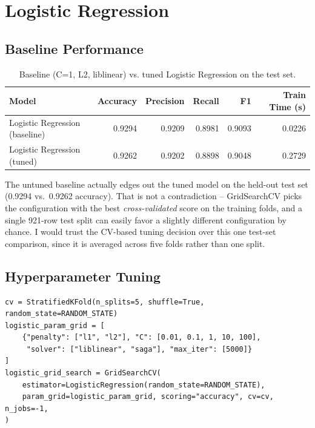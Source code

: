 \documentclass[11pt,a4paper]{article}
\begin{document}
\section{Logistic Regression}

\subsection{Baseline Performance}
\begin{table}[h]
\centering
\begin{tabular}{@{}lrrrrr@{}}
\toprule
Model & Accuracy & Precision & Recall & F1 & Train Time (s) \\
\midrule
Logistic Regression (baseline) & 0.9294 & 0.9209 & 0.8981 & 0.9093 & 0.0226 \\
Logistic Regression (tuned) & 0.9262 & 0.9202 & 0.8898 & 0.9048 & 0.2729 \\
\bottomrule
\end{tabular}
\caption{Baseline (C=1, L2, liblinear) vs. tuned Logistic Regression on the test set.}
\end{table}
The untuned baseline actually edges out the tuned model on the held-out test set (0.9294 vs.\ 0.9262 accuracy). That is not a contradiction -- GridSearchCV picks the configuration with the best \emph{cross-validated} score on the training folds, and a single 921-row test split can easily favor a slightly different configuration by chance. I would trust the CV-based tuning decision over this one test-set comparison, since it is averaged across five folds rather than one split.

\subsection{Hyperparameter Tuning}
\begin{lstlisting}
cv = StratifiedKFold(n_splits=5, shuffle=True, random_state=RANDOM_STATE)
logistic_param_grid = [
    {"penalty": ["l1", "l2"], "C": [0.01, 0.1, 1, 10, 100],
     "solver": ["liblinear", "saga"], "max_iter": [5000]}
]
logistic_grid_search = GridSearchCV(
    estimator=LogisticRegression(random_state=RANDOM_STATE),
    param_grid=logistic_param_grid, scoring="accuracy", cv=cv, n_jobs=-1,
)
\end{lstlisting}
\end{document}
